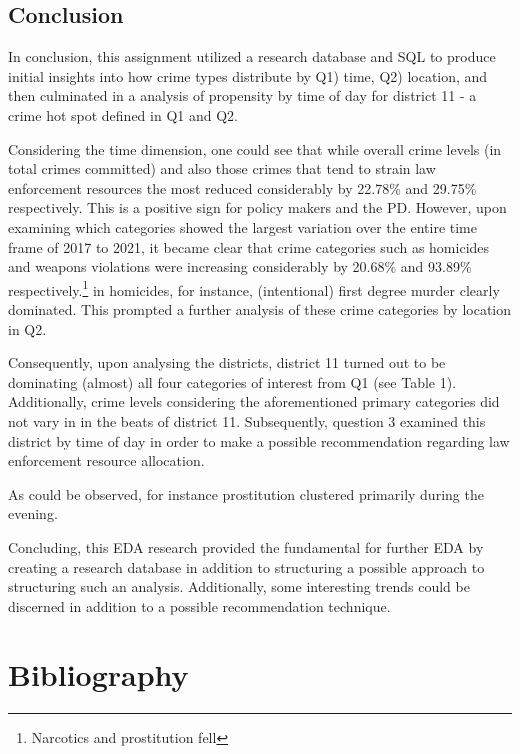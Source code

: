 \documentclass[a4paper]{article}
\begin{document}
\subsection{Conclusion}
In conclusion, this assignment utilized a research database and SQL to produce initial insights into how crime types distribute by Q1) time, Q2) location, and then culminated in a analysis of propensity by time of day for district 11 - a crime hot spot defined in Q1 and Q2.

\indent Considering the time dimension, one could see that while overall crime levels (in total crimes committed) and also those crimes that tend to strain law enforcement resources the most reduced considerably by 22.78\% and 29.75\% respectively. This is a positive sign for policy makers and the PD. However, upon examining which categories showed the largest variation over the entire time frame of 2017 to 2021, it became clear that crime categories such as homicides and weapons violations were increasing considerably by 20.68\% and 93.89\% respectively.\footnote{Narcotics and prostitution fell} in homicides, for instance, (intentional) first degree murder clearly dominated. This prompted a further analysis of these crime categories by location in Q2.

\indent Consequently, upon analysing the districts, district 11 turned out to be dominating (almost) all four categories of interest from Q1 (see Table 1). Additionally, crime levels considering the aforementioned primary categories did not vary in in the beats of district 11. Subsequently, question 3 examined this district by time of day in order to make a possible recommendation regarding law enforcement resource allocation.

\indent As could be observed, for instance prostitution clustered primarily during the evening.

Concluding, this EDA research provided the fundamental for further EDA by creating a research database in addition to structuring a possible approach to structuring such an analysis. Additionally, some interesting trends could be discerned in addition to a possible recommendation technique.






\section{Bibliography}
\end{document}
